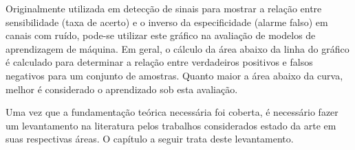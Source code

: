 Originalmente utilizada em detecção de sinais para mostrar a relação entre sensibilidade (taxa de acerto) e o inverso da especificidade (alarme falso) em canais com ruído, pode-se utilizar este gráfico na avaliação de modelos de aprendizagem de máquina. Em geral, o cálculo da área abaixo da linha do gráfico é calculado para determinar a relação entre verdadeiros positivos e falsos negativos para um conjunto de amostras. Quanto maior a área abaixo da curva, melhor é considerado o aprendizado sob esta avaliação.

Uma vez que a fundamentação teórica necessária foi coberta, é necessário fazer um levantamento na literatura pelos trabalhos considerados estado da arte em suas respectivas áreas. O capítulo a seguir trata deste levantamento.
